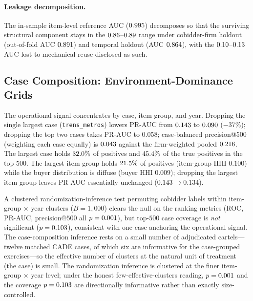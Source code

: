\paragraph{Leakage decomposition.} The in-sample item-level reference
AUC ($0.995$) decomposes so that the surviving structural
component stays in the $0.86$--$0.89$ range
under cobidder-firm holdout (out-of-fold AUC $0.891$) and
temporal holdout (AUC $0.864$), with the
$0.10$--$0.13$ AUC lost to mechanical reuse
disclosed as such.

\subsection{Case Composition: Environment-Dominance Grids}
\label{supp:environment_dominance}

The operational signal concentrates by case, item group, and year.
Dropping the single largest case (\texttt{trens\_metros}) lowers PR-AUC
from $0.143$ to $0.090$ ($-37\%$);
dropping the top two cases takes PR-AUC to $0.058$; case-balanced
precision@$500$ (weighting each case equally) is $0.043$
against the firm-weighted pooled $0.216$. The largest case holds
$32.0\%$ of positives and $45.4\%$ of the true
positives in the top $500$. The largest item group holds
$21.5\%$ of positives (item-group HHI $0.100$) while the
buyer distribution is diffuse (buyer HHI $0.009$); dropping the largest
item group leaves PR-AUC essentially unchanged ($0.143 \to 0.134$).

A clustered randomization-inference test permuting cobidder labels
within item-group $\times$ year clusters ($B=1{,}000$) clears the null
on the ranking metrics (ROC, PR-AUC, precision@$500$ all
$p=0.001$), but top-$500$ case coverage is \emph{not}
significant ($p=0.103$), consistent with one case anchoring
the operational signal. The case-composition inference rests on a small
number of adjudicated cartels---twelve matched CADE cases, of which six
are informative for the case-grouped exercises---so the effective number
of clusters at the natural unit of treatment (the case) is small. The
randomization inference is clustered at the finer item-group $\times$
year level; under the honest few-effective-clusters reading,
$p=0.001$ and the coverage $p=0.103$ are
directionally informative rather than exactly size-controlled.

